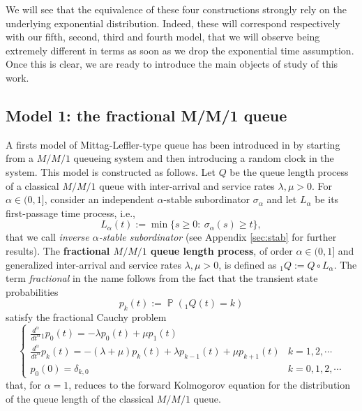 \documentclass[]{amsart}
\numberwithin{equation}{section}
\theoremstyle{remark}
\theoremstyle{definition}
\DeclareMathOperator{\bP}{\mathbb{P}}
\newcommand{\dersup}[3]{\frac{d^{#3} #1}{d #2^{#3}}}
\begin{document}
{We will see that the equivalence of these four constructions strongly rely on the underlying exponential distribution. Indeed, these will correspond respectively with our fifth, second, third and fourth model, that we will observe being extremely different in terms as soon as we drop the exponential time assumption. Once this is clear, we are ready to introduce the main objects of study of this work.}

\subsection{Model 1: the fractional M/M/1 queue}\label{subsmod1}
A firsts model of Mittag-Leffler-type queue has been introduced in \cite{cahoy2015transient} {by starting from a $M/M/1$ queueing system and then introducing a random clock in the system}. This model is constructed as follows. {Let $Q$ be the queue length process of a classical $M/M/1$ queue with inter-arrival and service rates $\lambda,\mu>0$. For $\alpha \in (0,1]$, consider an independent $\alpha$-stable subordinator $\sigma_\alpha$ and let $L_\alpha$ be its first-passage time process, i.e.,
\begin{equation*}
L_\alpha(t):=\min\{s \ge 0: \ \sigma_\alpha(s) \ge t\},
\end{equation*}
that we call \textit{inverse $\alpha$-stable subordinator} (see Appendix \ref{sec:stab} for further results).}
The \textbf{fractional $M/M/1$ queue length process}, of order $\alpha \in (0,1]$ and {generalized} inter-arrival and service rates $\lambda,\mu>0$, is defined as ${}_1Q:=Q \circ L_\alpha$. The term \textit{fractional} in the name follows from the fact that the transient state probabilities
\begin{equation*}
	p_k(t):=\bP({}_1Q(t)=k)
\end{equation*}
satisfy the fractional Cauchy problem
\begin{equation*}
	\begin{cases}
		\displaystyle \dersup{}{t}{\alpha}{}_1p_0(t)=-\lambda p_0(t)+\mu p_1(t)\\[7pt]
		\displaystyle \dersup{}{t}{\alpha}p_k(t)=-(\lambda+\mu) p_k(t)+\lambda p_{k-1}(t)+\mu p_{k+1}(t)  & k=1,2,\cdots \\[7pt]
		p_0(0)=\delta_{k,0} & k=0,1,2,\cdots 
	\end{cases}
\end{equation*}
that, for $\alpha=1$, reduces to the forward Kolmogorov equation for the distribution of the queue length of the classical $M/M/1$ queue.
\end{document}
